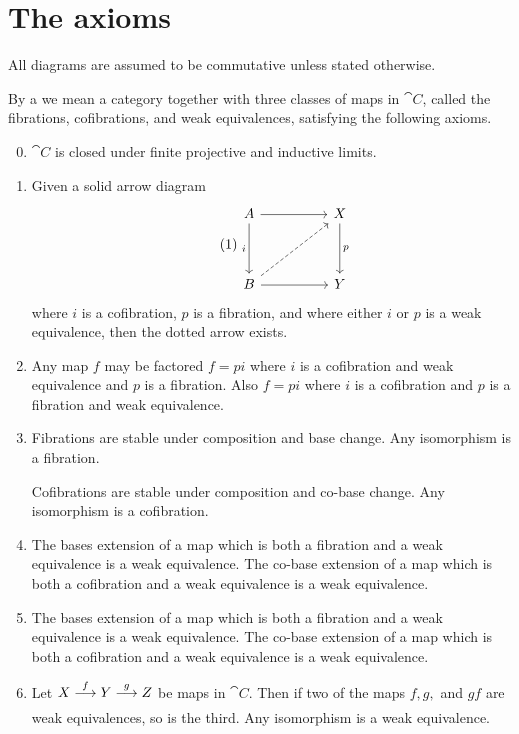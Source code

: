 \documentclass[../main]{subfiles}
\begin{document}
\section{The axioms}\label{sec:1.1}
All diagrams are assumed to be commutative unless stated otherwise.

\begin{definition}
\label{def:1.1.1}
By a  we mean a category together with three classes of maps in $\cat{C}$, called the fibrations, cofibrations, and weak equivalences, satisfying the following axioms.

\begin{enumerate}[label = M\arabic*]\setcounter{enumi}{-1}

\item\label{1.1.M0} $\cat{C}$ is closed under finite projective and inductive limits.
\item\label{1.1.M1} Given a solid arrow diagram
\[\tag{1}\label{diag:1.1.1}\begin{tikzcd}
	A && X \\ \\
	B && Y
	\arrow["i" left, from=1-1, to=3-1]
	\arrow["p", from=1-3, to=3-3]
	\arrow[from=1-1, to=1-3]
	\arrow[from=3-1, to=3-3]
	\arrow[dashed, from=3-1, to=1-3]
\end{tikzcd}\]
where $i$ is a cofibration, $p$ is a fibration, and where either $i$ or $p$ is a weak equivalence, then the dotted arrow exists.
\item\label{1.1.M2} Any map $f$ may be factored $f=p i$ where $i$ is a cofibration and weak equivalence and $p$ is a fibration. Also $f=p i$ where $i$ is a cofibration and $p$ is a fibration and weak equivalence.
\item\label{1.1.M3} Fibrations are stable under composition and base change. Any isomorphism is a fibration.

Cofibrations are stable under composition and co-base change. Any isomorphism is a cofibration.

\item\label{1.1.M4} The bases extension of a map which is both a fibration and a weak equivalence is a weak equivalence. The co-base extension of a map which is both a cofibration and a weak equivalence is a weak equivalence.

\item\label{1.1.M5} The bases extension of a map which is both a fibration and a weak equivalence is a weak equivalence. The co-base extension of a map which is both a cofibration and a weak equivalence is a weak equivalence.

\item\label{1.1.M6} Let $X\varrightarrow{f} Y\varrightarrow{g}Z$ be maps in $\cat{C}$. Then if two of the maps $f,g,$ and $gf$ are weak equivalences, so is the third. Any isomorphism is a weak equivalence.
\end{enumerate}
\end{definition}
\end{document}
